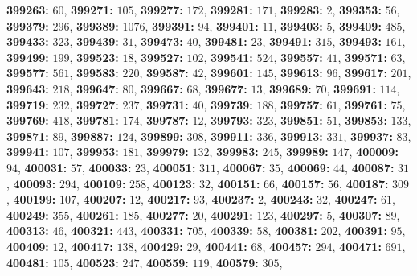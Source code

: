 \textsf{\bfseries 399263:} $60$, \textsf{\bfseries 399271:} $105$, \textsf{\bfseries 399277:} $172$, \textsf{\bfseries 399281:} $171$, \textsf{\bfseries 399283:} $2$, \textsf{\bfseries 399353:} $56$, \textsf{\bfseries 399379:} $296$, \textsf{\bfseries 399389:} $1076$, \textsf{\bfseries 399391:} $94$, \textsf{\bfseries 399401:} $11$, \textsf{\bfseries 399403:} $5$, \textsf{\bfseries 399409:} $485$, \textsf{\bfseries 399433:} $323$, \textsf{\bfseries 399439:} $31$, \textsf{\bfseries 399473:} $40$, \textsf{\bfseries 399481:} $23$, \textsf{\bfseries 399491:} $315$, \textsf{\bfseries 399493:} $161$, \textsf{\bfseries 399499:} $199$, \textsf{\bfseries 399523:} $18$, \textsf{\bfseries 399527:} $102$, \textsf{\bfseries 399541:} $524$, \textsf{\bfseries 399557:} $41$, \textsf{\bfseries 399571:} $63$, \textsf{\bfseries 399577:} $561$, \textsf{\bfseries 399583:} $220$, \textsf{\bfseries 399587:} $42$, \textsf{\bfseries 399601:} $145$, \textsf{\bfseries 399613:} $96$, \textsf{\bfseries 399617:} $201$, \textsf{\bfseries 399643:} $218$, \textsf{\bfseries 399647:} $80$, \textsf{\bfseries 399667:} $68$, \textsf{\bfseries 399677:} $13$, \textsf{\bfseries 399689:} $70$, \textsf{\bfseries 399691:} $114$, \textsf{\bfseries 399719:} $232$, \textsf{\bfseries 399727:} $237$, \textsf{\bfseries 399731:} $40$, \textsf{\bfseries 399739:} $188$, \textsf{\bfseries 399757:} $61$, \textsf{\bfseries 399761:} $75$, \textsf{\bfseries 399769:} $418$, \textsf{\bfseries 399781:} $174$, \textsf{\bfseries 399787:} $12$, \textsf{\bfseries 399793:} $323$, \textsf{\bfseries 399851:} $51$, \textsf{\bfseries 399853:} $133$, \textsf{\bfseries 399871:} $89$, \textsf{\bfseries 399887:} $124$, \textsf{\bfseries 399899:} $308$, \textsf{\bfseries 399911:} $336$, \textsf{\bfseries 399913:} $331$, \textsf{\bfseries 399937:} $83$, \textsf{\bfseries 399941:} $107$, \textsf{\bfseries 399953:} $181$, \textsf{\bfseries 399979:} $132$, \textsf{\bfseries 399983:} $245$, \textsf{\bfseries 399989:} $147$, \textsf{\bfseries 400009:} $94$, \textsf{\bfseries 400031:} $57$, \textsf{\bfseries 400033:} $23$, \textsf{\bfseries 400051:} $311$, \textsf{\bfseries 400067:} $35$, \textsf{\bfseries 400069:} $44$, \textsf{\bfseries 400087:} $31$, \textsf{\bfseries 400093:} $294$, \textsf{\bfseries 400109:} $258$, \textsf{\bfseries 400123:} $32$, \textsf{\bfseries 400151:} $66$, \textsf{\bfseries 400157:} $56$, \textsf{\bfseries 400187:} $309$, \textsf{\bfseries 400199:} $107$, \textsf{\bfseries 400207:} $12$, \textsf{\bfseries 400217:} $93$, \textsf{\bfseries 400237:} $2$, \textsf{\bfseries 400243:} $32$, \textsf{\bfseries 400247:} $61$, \textsf{\bfseries 400249:} $355$, \textsf{\bfseries 400261:} $185$, \textsf{\bfseries 400277:} $20$, \textsf{\bfseries 400291:} $123$, \textsf{\bfseries 400297:} $5$, \textsf{\bfseries 400307:} $89$, \textsf{\bfseries 400313:} $46$, \textsf{\bfseries 400321:} $443$, \textsf{\bfseries 400331:} $705$, \textsf{\bfseries 400339:} $58$, \textsf{\bfseries 400381:} $202$, \textsf{\bfseries 400391:} $95$, \textsf{\bfseries 400409:} $12$, \textsf{\bfseries 400417:} $138$, \textsf{\bfseries 400429:} $29$, \textsf{\bfseries 400441:} $68$, \textsf{\bfseries 400457:} $294$, \textsf{\bfseries 400471:} $691$, \textsf{\bfseries 400481:} $105$, \textsf{\bfseries 400523:} $247$, \textsf{\bfseries 400559:} $119$, \textsf{\bfseries 400579:} $305$, 
